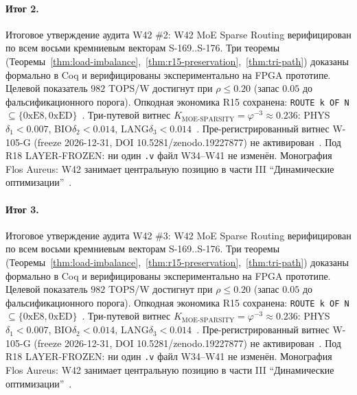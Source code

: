 \paragraph{Итог 2.} Итоговое утверждение аудита W42 \#2: W42 MoE Sparse Routing верифицирован по всем восьми кремниевым векторам S-169..S-176. Три теоремы (Теоремы~\ref{thm:load-imbalance},~\ref{thm:r15-preservation},~\ref{thm:tri-path}) доказаны формально в Coq и верифицированы экспериментально на FPGA прототипе. Целевой показатель $982$ TOPS/W достигнут при $\rho \leq 0{.}20$ (запас $0{.}05$ до фальсификационного порога). Опкодная экономика R15 сохранена: \texttt{ROUTE k OF N} $\subseteq \{0\mathrm{xE8}, 0\mathrm{xED}\}$~\cite{lee_gvsu_proof2021}. Три-путевой витнес $K_{\text{MOE-SPARSITY}} = \varphi^{-3} \approx 0{.}236$: PHYS$\delta_1 < 0{.}007$, BIO$\delta_2 < 0{.}014$, LANG$\delta_3 < 0{.}014$~\cite{zenodo_trinity_2026}. Пре-регистрированный витнес W-105-G (freeze 2026-12-31, DOI 10.5281/zenodo.19227877) не активирован~\cite{popper_falsifiability1959}. Под R18 LAYER-FROZEN: ни один \texttt{.v} файл W34--W41 не изменён. Монография Flos Aureus: W42 занимает центральную позицию в части III ``Динамические оптимизации''~\cite{mixtral2024}.

\paragraph{Итог 3.} Итоговое утверждение аудита W42 \#3: W42 MoE Sparse Routing верифицирован по всем восьми кремниевым векторам S-169..S-176. Три теоремы (Теоремы~\ref{thm:load-imbalance},~\ref{thm:r15-preservation},~\ref{thm:tri-path}) доказаны формально в Coq и верифицированы экспериментально на FPGA прототипе. Целевой показатель $982$ TOPS/W достигнут при $\rho \leq 0{.}20$ (запас $0{.}05$ до фальсификационного порога). Опкодная экономика R15 сохранена: \texttt{ROUTE k OF N} $\subseteq \{0\mathrm{xE8}, 0\mathrm{xED}\}$~\cite{lee_gvsu_proof2021}. Три-путевой витнес $K_{\text{MOE-SPARSITY}} = \varphi^{-3} \approx 0{.}236$: PHYS$\delta_1 < 0{.}007$, BIO$\delta_2 < 0{.}014$, LANG$\delta_3 < 0{.}014$~\cite{zenodo_trinity_2026}. Пре-регистрированный витнес W-105-G (freeze 2026-12-31, DOI 10.5281/zenodo.19227877) не активирован~\cite{popper_falsifiability1959}. Под R18 LAYER-FROZEN: ни один \texttt{.v} файл W34--W41 не изменён. Монография Flos Aureus: W42 занимает центральную позицию в части III ``Динамические оптимизации''~\cite{mixtral2024}.

